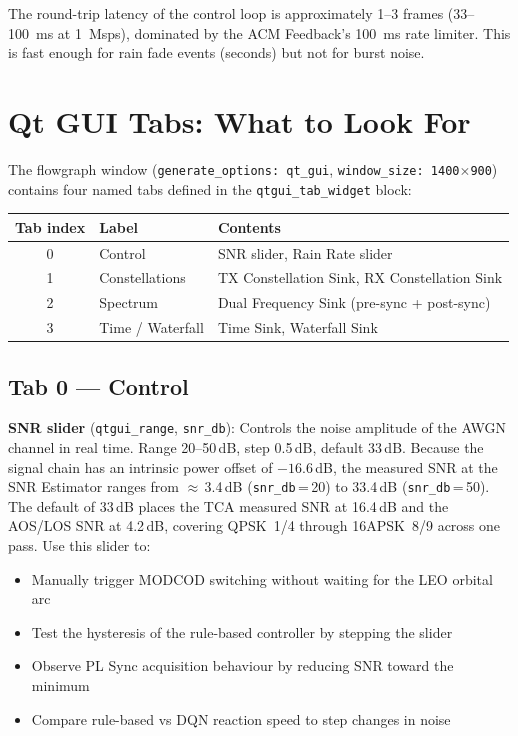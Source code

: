 \documentclass[12pt,a4paper]{report}
\begin{document}
The round-trip latency of the control loop is approximately 1--3 frames
(33--100~ms at 1~Msps), dominated by the ACM Feedback's 100~ms rate limiter.
This is fast enough for rain fade events (seconds) but not for burst noise.

\section{Qt GUI Tabs: What to Look For}
\label{sec:gui_panels}

The flowgraph window (\texttt{generate\_options: qt\_gui},
\texttt{window\_size: 1400$\times$900}) contains four named tabs defined in
the \texttt{qtgui\_tab\_widget} block:

\begin{center}
\begin{tabular}{cll}
\toprule
\textbf{Tab index} & \textbf{Label} & \textbf{Contents} \\
\midrule
0 & Control        & SNR slider, Rain Rate slider \\
1 & Constellations & TX Constellation Sink, RX Constellation Sink \\
2 & Spectrum       & Dual Frequency Sink (pre-sync + post-sync) \\
3 & Time / Waterfall & Time Sink, Waterfall Sink \\
\bottomrule
\end{tabular}
\end{center}

\subsection{Tab 0 --- Control}

\textbf{SNR slider} (\texttt{qtgui\_range}, \texttt{snr\_db}): Controls the
noise amplitude of the AWGN channel in real time.  Range 20--50\,dB, step
0.5\,dB, default 33\,dB.  Because the signal chain has an intrinsic power
offset of $-16.6$\,dB, the measured SNR at the SNR Estimator ranges from
$\approx$\,3.4\,dB (\texttt{snr\_db}\,=\,20) to 33.4\,dB
(\texttt{snr\_db}\,=\,50).  The default of 33\,dB places the TCA measured
SNR at 16.4\,dB and the AOS/LOS SNR at 4.2\,dB, covering QPSK~1/4 through
16APSK~8/9 across one pass.  Use this slider to:
\begin{itemize}[nosep]
    \item Manually trigger MODCOD switching without waiting for the LEO orbital arc
    \item Test the hysteresis of the rule-based controller by stepping the slider
    \item Observe PL Sync acquisition behaviour by reducing SNR toward the minimum
    \item Compare rule-based vs DQN reaction speed to step changes in noise
\end{itemize}
\end{document}
